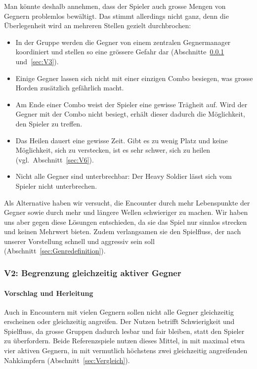 \documentclass[../Main.tex]{subfiles}
\begin{document}
Man könnte deshalb annehmen, dass der Spieler auch grosse Mengen von Gegnern problemlos bewältigt. Das stimmt allerdings nicht ganz, denn die Überlegenheit wird an mehreren Stellen gezielt durchbrochen:

\begin{itemize}[leftmargin=1.5cm]
    \item In der Gruppe werden die Gegner von einem zentralen Gegnermanager koordiniert und stellen so eine grössere Gefahr dar (Abschnitte~\ref{sec:V2} und~\ref{sec:V3}).
    \item Einige Gegner lassen sich nicht mit einer einzigen Combo besiegen, was grosse Horden zusätzlich gefährlich macht.
    \item Am Ende einer Combo weist der Spieler eine gewisse Trägheit auf. Wird der Gegner mit der Combo nicht besiegt, erhält dieser dadurch die Möglichkeit, den Spieler zu treffen.
    \item Das Heilen dauert eine gewisse Zeit. Gibt es zu wenig Platz und keine Möglichkeit, sich zu verstecken, ist es sehr schwer, sich zu heilen (vgl.~Abschnitt~\ref{sec:V6}).
    \item Nicht alle Gegner sind unterbrechbar: Der Heavy Soldier lässt sich vom Spieler nicht unterbrechen.
\end{itemize}

Als Alternative haben wir versucht, die Encounter durch mehr Lebenspunkte der Gegner sowie durch mehr und längere Wellen schwieriger zu machen. Wir haben uns aber gegen diese Lösungen entschieden, da sie das Spiel nur sinnlos strecken und keinen Mehrwert bieten. Zudem verlangsamen sie den Spielfluss, der nach unserer Vorstellung schnell und aggressiv sein soll (Abschnitt~\ref{sec:Genredefinition}).

\subsubsection{V2: Begrenzung gleichzeitig aktiver Gegner} \label{sec:V2}

\paragraph{Vorschlag und Herleitung}
Auch in Encountern mit vielen Gegnern sollen nicht alle Gegner gleichzeitig erscheinen oder gleichzeitig angreifen. Der Nutzen betrifft Schwierigkeit und Spielfluss, da grosse Gruppen dadurch lesbar und fair bleiben, statt den Spieler zu überfordern. Beide Referenzspiele nutzen dieses Mittel, in  mit maximal etwa vier aktiven Gegnern, in  mit vermutlich höchstens zwei gleichzeitig angreifenden Nahkämpfern (Abschnitt~\ref{sec:Vergleich}).
\end{document}
